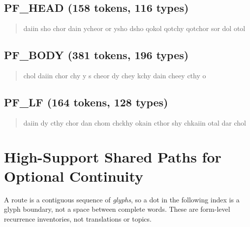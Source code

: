 \documentclass[11pt,a4paper]{article}
\begin{document}
\subsection*{PF\_HEAD (158 tokens, 116 types)}
\begin{quote}\ttfamily\small\sloppy daiin  sho  chor  dain  ycheor  or  ysho  dsho  qokol  qotchy  qotchor  sor  dol  otol\end{quote}
\subsection*{PF\_BODY (381 tokens, 196 types)}
\begin{quote}\ttfamily\small\sloppy chol  daiin  chor  chy  y  s  cheor  dy  chey  kchy  dain  cheey  cthy  o\end{quote}
\subsection*{PF\_LF (164 tokens, 128 types)}
\begin{quote}\ttfamily\small\sloppy daiin  dy  cthy  chor  dan  chom  chckhy  okain  cthor  shy  chkaiin  otal  dar  chol\end{quote}


\section{High-Support Shared Paths for Optional Continuity}
A route is a contiguous sequence of \emph{glyphs}, so a dot in the following index is a glyph boundary, not a space between complete words. These are form-level recurrence inventories, not translations or topics.
\end{document}
